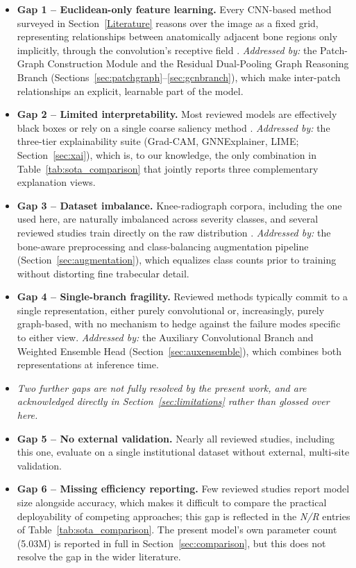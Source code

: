 \documentclass[conference]{IEEEtran}
\begin{document}
\begin{itemize}
    \item \textbf{Gap 1 -- Euclidean-only feature learning.} Every CNN-based method surveyed in Section~\ref{Literature} reasons over the image as a fixed grid, representing relationships between anatomically adjacent bone regions only implicitly, through the convolution's receptive field \cite{Amani2024, Sarhan2024, mienye2025graph}. \emph{Addressed by:} the Patch-Graph Construction Module and the Residual Dual-Pooling Graph Reasoning Branch (Sections~\ref{sec:patchgraph}--\ref{sec:gcnbranch}), which make inter-patch relationships an explicit, learnable part of the model.
    \item \textbf{Gap 2 -- Limited interpretability.} Most reviewed models are effectively black boxes or rely on a single coarse saliency method \cite{salahuddin2022transparency, gradcam}. \emph{Addressed by:} the three-tier explainability suite (Grad-CAM, GNNExplainer, LIME; Section~\ref{sec:xai}), which is, to our knowledge, the only combination in Table~\ref{tab:sota_comparison} that jointly reports three complementary explanation views.
    \item \textbf{Gap 3 -- Dataset imbalance.} Knee-radiograph corpora, including the one used here, are naturally imbalanced across severity classes, and several reviewed studies train directly on the raw distribution \cite{wani2023osteoporosis, Naguib2024}. \emph{Addressed by:} the bone-aware preprocessing and class-balancing augmentation pipeline (Section~\ref{sec:augmentation}), which equalizes class counts prior to training without distorting fine trabecular detail.
    \item \textbf{Gap 4 -- Single-branch fragility.} Reviewed methods typically commit to a single representation, either purely convolutional or, increasingly, purely graph-based, with no mechanism to hedge against the failure modes specific to either view. \emph{Addressed by:} the Auxiliary Convolutional Branch and Weighted Ensemble Head (Section~\ref{sec:auxensemble}), which combines both representations at inference time.
\end{itemize}

\begin{itemize}
    \item[] \textit{Two further gaps are not fully resolved by the present work, and are acknowledged directly in Section~\ref{sec:limitations} rather than glossed over here.}
    \item \textbf{Gap 5 -- No external validation.} Nearly all reviewed studies, including this one, evaluate on a single institutional dataset without external, multi-site validation.
    \item \textbf{Gap 6 -- Missing efficiency reporting.} Few reviewed studies report model size alongside accuracy, which makes it difficult to compare the practical deployability of competing approaches; this gap is reflected in the \emph{N/R} entries of Table~\ref{tab:sota_comparison}. The present model's own parameter count (5.03M) is reported in full in Section~\ref{sec:comparison}, but this does not resolve the gap in the wider literature.
\end{itemize}
\end{document}
